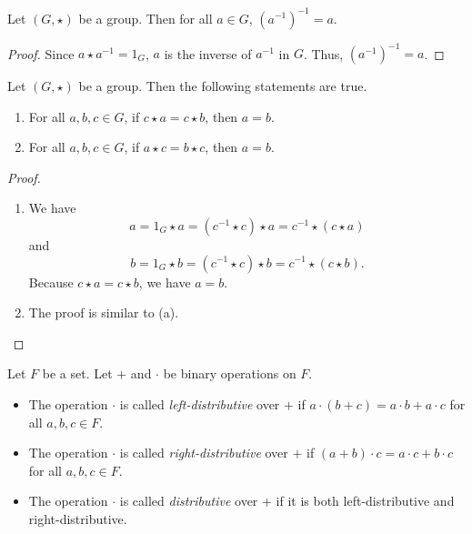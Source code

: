 \begin{theorem}\label{thm:inverse-inverse}
  Let $(G, \star)$ be a group. Then for all $a \in G$, $(a^{-1})^{-1} = a$.
\end{theorem}
\begin{proof}
  Since $a \star a^{-1} = 1_G$, $a$ is the inverse of $a^{-1}$ in $G$.
  Thus, $(a^{-1})^{-1} = a$.
\end{proof}

\begin{theorem}\label{thm:group-cancel}
  Let $(G, \star)$ be a group. Then the following statements are true.
  \begin{enumerate}
    \item For all $a, b, c \in G$, if $c \star a = c \star b$, then $a = b$.
    \item For all $a, b, c \in G$, if $a \star c = b \star c$, then $a = b$.
  \end{enumerate}
\end{theorem}
\begin{proof} \leavevmode
  \begin{enumerate}
    \item We have
      $$
      a = 1_G \star a = (c^{-1} \star c) \star a = c^{-1} \star (c \star a)
      $$
      and
      $$
      b = 1_G \star b = (c^{-1} \star c) \star b = c^{-1} \star (c \star b).
      $$
      Because $c \star a = c \star b$, we have $a = b$.
    \item The proof is similar to (a). \qedhere
  \end{enumerate}
\end{proof}

\begin{definition}
  Let $F$ be a set. Let $+$ and $\cdot$ be binary operations on $F$.
  \begin{itemize}
    \item The operation $\cdot$ is called \emph{left-distributive} over $+$
      if $a \cdot (b + c) = a \cdot b + a \cdot c$ for all $a, b, c \in F$.
    \item The operation $\cdot$ is called \emph{right-distributive} over $+$
      if $(a + b) \cdot c = a \cdot c + b \cdot c$ for all $a, b, c \in F$.
    \item The operation $\cdot$ is called \emph{distributive} over $+$
      if it is both left-distributive and right-distributive.
  \end{itemize}
\end{definition}

